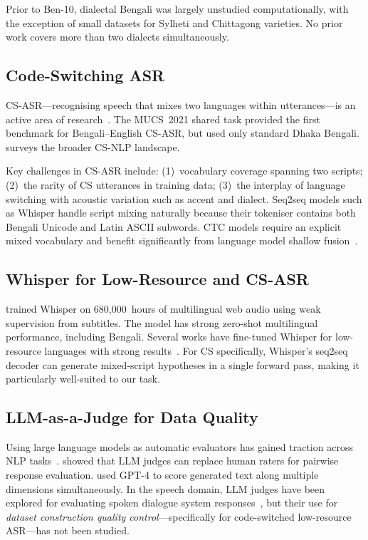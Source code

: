 Prior to Ben-10, dialectal Bengali was largely unstudied computationally,
with the exception of small datasets for Sylheti \citep{sylheti2019} and
Chittagong \citep{chatgaiya2022} varieties.
No prior work covers more than two dialects simultaneously.

\subsection{Code-Switching ASR}

CS-ASR---recognising speech that mixes two languages within utterances---is
an active area of research~\citep{yilmaz2016cs_survey}.
The MUCS~2021 shared task \citep{mucs2021} provided the first benchmark for
Bengali--English CS-ASR, but used only standard Dhaka Bengali.
\citet{sitaram2019survey} surveys the broader CS-NLP landscape.

Key challenges in CS-ASR include: (1)~vocabulary coverage spanning two
scripts; (2)~the rarity of CS utterances in training data;
(3)~the interplay of language switching with acoustic variation such as
accent and dialect.
Seq2seq models such as Whisper handle script mixing naturally because their
tokeniser contains both Bengali Unicode and Latin ASCII subwords.
CTC models require an explicit mixed vocabulary and benefit significantly from
language model shallow fusion~\citep{hannun2014deep,chan2016listen}.

\subsection{Whisper for Low-Resource and CS-ASR}

\citet{radford2023whisper} trained Whisper on 680,000~hours of multilingual
web audio using weak supervision from subtitles.
The model has strong zero-shot multilingual performance, including Bengali.
Several works have fine-tuned Whisper for low-resource languages with strong
results~\citep{gandhi2023whisper}.
For CS specifically, Whisper's seq2seq decoder can generate mixed-script
hypotheses in a single forward pass, making it particularly well-suited to
our task.

\subsection{LLM-as-a-Judge for Data Quality}

Using large language models as automatic evaluators has gained traction
across NLP tasks~\citep{zheng2023judging}.
\citet{wang2023pandalm} showed that LLM judges can replace human raters for
pairwise response evaluation.
\citet{fu2023gptscore} used GPT-4 to score generated text along multiple
dimensions simultaneously.
In the speech domain, LLM judges have been explored for evaluating
spoken dialogue system responses~\citep{kim2023llm_eval_spoken}, but their
use for \emph{dataset construction quality control}---specifically for
code-switched low-resource ASR---has not been studied.

